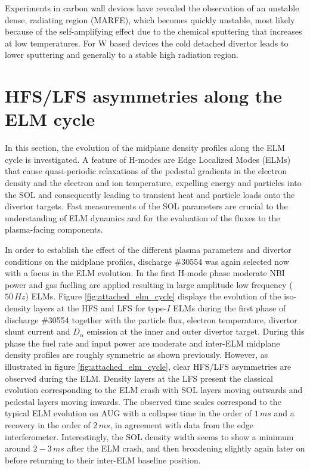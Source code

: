 \documentclass[12pt]{iopart}
\begin{document}
Experiments in carbon wall devices have revealed the observation of an unstable dense, radiating region (MARFE), which becomes quickly unstable, most likely because of the self-amplifying effect due to the chemical sputtering that increases at low temperatures. For W based devices the cold detached divertor leads to lower sputtering and generally to a stable high radiation region.

\section{HFS/LFS asymmetries along the ELM cycle}
\label{section:hfslfselmcycle}

In this section, the evolution of the midplane density profiles along the ELM cycle is investigated. A feature of H-modes are Edge Localized Modes (ELMs)\cite{zohm1996edge} that cause quasi-periodic relaxations of the pedestal gradients in the electron density and the electron and ion temperature, expelling energy and particles into the SOL and consequently leading to transient heat and particle loads onto the divertor targets. Fast measurements of the SOL parameters are crucial to the understanding of ELM dynamics and for the evaluation of the fluxes to the plasma-facing components.

In order to establish the effect of the different plasma parameters and divertor conditions on the midplane profiles, discharge \#30554 was again selected now with a focus in the ELM evolution. In the first H-mode phase moderate NBI power and gas fuelling are applied resulting in large amplitude low frequency ($50\,Hz$) ELMs. Figure \ref{fig:attached_elm_cycle} displays the evolution of the iso-density layers at the HFS and LFS for type-$I$ ELMs during the first phase of discharge \#30554 together with the particle flux, electron temperature, divertor shunt current and $D_\alpha$ emission at the inner and outer divertor target. During this phase the fuel rate and input power are moderate and inter-ELM midplane density profiles are roughly symmetric as shown previously. However, as illustrated in figure \ref{fig:attached_elm_cycle}, clear HFS/LFS asymmetries are observed during the ELM. Density layers at the LFS present the classical evolution corresponding to the ELM crash with SOL layers moving outwards and pedestal layers moving inwards. The observed time scales correspond to the typical ELM evolution on AUG with a collapse time in the order of $1\,ms$ and a recovery in the order of $2\,ms$, in agreement with data from the edge interferometer. Interestingly, the SOL density width seems to show a minimum around $2-3\,ms$ after the ELM crash, and then broadening slightly again later on before returning to their inter-ELM baseline position.
\end{document}
